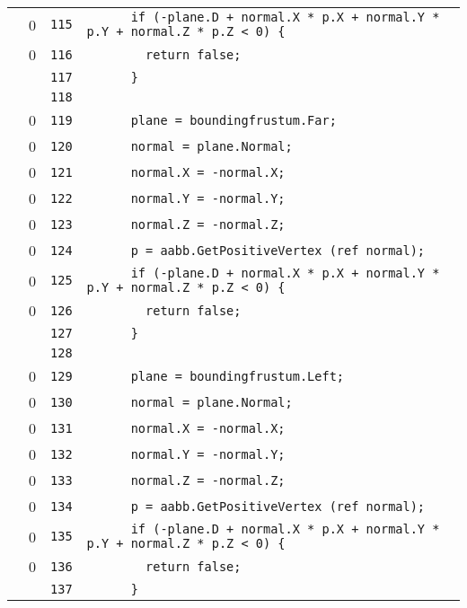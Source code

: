\documentclass[a4paper,10pt]{article}
\begin{document}
\begin{longtable}[l]{lrrl}
\cellcolor{red} & 0 & \verb~115~ & \verb~      if (-plane.D + normal.X * p.X + normal.Y * p.Y + normal.Z * p.Z < 0) {~\\
\cellcolor{red} & 0 & \verb~116~ & \verb~        return false;~\\
\cellcolor{gray} &  & \verb~117~ & \verb~      }~\\
\cellcolor{gray} &  & \verb~118~ & \verb~~\\
\cellcolor{red} & 0 & \verb~119~ & \verb~      plane = boundingfrustum.Far;~\\
\cellcolor{red} & 0 & \verb~120~ & \verb~      normal = plane.Normal;~\\
\cellcolor{red} & 0 & \verb~121~ & \verb~      normal.X = -normal.X;~\\
\cellcolor{red} & 0 & \verb~122~ & \verb~      normal.Y = -normal.Y;~\\
\cellcolor{red} & 0 & \verb~123~ & \verb~      normal.Z = -normal.Z;~\\
\cellcolor{red} & 0 & \verb~124~ & \verb~      p = aabb.GetPositiveVertex (ref normal);~\\
\cellcolor{red} & 0 & \verb~125~ & \verb~      if (-plane.D + normal.X * p.X + normal.Y * p.Y + normal.Z * p.Z < 0) {~\\
\cellcolor{red} & 0 & \verb~126~ & \verb~        return false;~\\
\cellcolor{gray} &  & \verb~127~ & \verb~      }~\\
\cellcolor{gray} &  & \verb~128~ & \verb~~\\
\cellcolor{red} & 0 & \verb~129~ & \verb~      plane = boundingfrustum.Left;~\\
\cellcolor{red} & 0 & \verb~130~ & \verb~      normal = plane.Normal;~\\
\cellcolor{red} & 0 & \verb~131~ & \verb~      normal.X = -normal.X;~\\
\cellcolor{red} & 0 & \verb~132~ & \verb~      normal.Y = -normal.Y;~\\
\cellcolor{red} & 0 & \verb~133~ & \verb~      normal.Z = -normal.Z;~\\
\cellcolor{red} & 0 & \verb~134~ & \verb~      p = aabb.GetPositiveVertex (ref normal);~\\
\cellcolor{red} & 0 & \verb~135~ & \verb~      if (-plane.D + normal.X * p.X + normal.Y * p.Y + normal.Z * p.Z < 0) {~\\
\cellcolor{red} & 0 & \verb~136~ & \verb~        return false;~\\
\cellcolor{gray} &  & \verb~137~ & \verb~      }~\\

\end{longtable}
\end{document}
